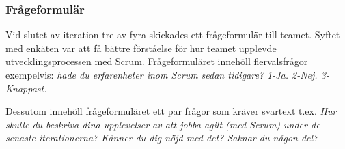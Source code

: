 \subsubsection {Frågeformulär}
Vid slutet av iteration tre av fyra skickades ett frågeformulär till teamet. Syftet med enkäten var att få bättre förståelse för hur teamet upplevde utvecklingsprocessen med Scrum. Frågeformuläret innehöll  flervalsfrågor exempelvis: \textit{hade du erfarenheter inom Scrum sedan tidigare? 1-Ja. 2-Nej. 3-Knappast.}

Dessutom innehöll frågeformuläret ett par frågor som kräver svartext t.ex. \textit{Hur skulle du beskriva dina upplevelser av att jobba agilt (med Scrum) under de senaste iterationerna? Känner du dig nöjd med det? Saknar du någon del?}
\newpage